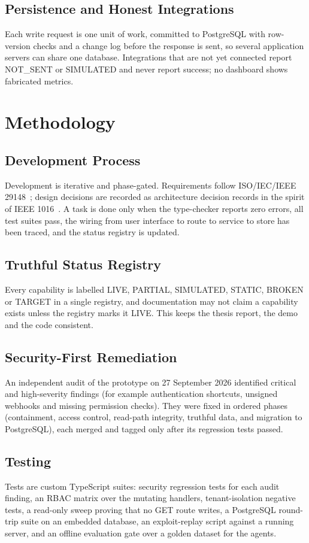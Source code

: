 \documentclass[conference,a4paper]{IEEEtran}
\begin{document}
\subsection{Persistence and Honest Integrations}
Each write request is one unit of work, committed to PostgreSQL with row-version checks and a change log before the response is sent, so several application servers can share one database. Integrations that are not yet connected report NOT\_SENT or SIMULATED and never report success; no dashboard shows fabricated metrics.


\section{Methodology}
\subsection{Development Process}
Development is iterative and phase-gated. Requirements follow ISO/IEC/IEEE 29148~\cite{iso29148}; design decisions are recorded as architecture decision records in the spirit of IEEE 1016~\cite{ieee1016}. A task is done only when the type-checker reports zero errors, all test suites pass, the wiring from user interface to route to service to store has been traced, and the status registry is updated.

\subsection{Truthful Status Registry}
Every capability is labelled LIVE, PARTIAL, SIMULATED, STATIC, BROKEN or TARGET in a single registry, and documentation may not claim a capability exists unless the registry marks it LIVE. This keeps the thesis report, the demo and the code consistent.

\subsection{Security-First Remediation}
An independent audit of the prototype on 27 September 2026 identified critical and high-severity findings (for example authentication shortcuts, unsigned webhooks and missing permission checks). They were fixed in ordered phases (containment, access control, read-path integrity, truthful data, and migration to PostgreSQL), each merged and tagged only after its regression tests passed.

\subsection{Testing}
Tests are custom TypeScript suites: security regression tests for each audit finding, an RBAC matrix over the mutating handlers, tenant-isolation negative tests, a read-only sweep proving that no GET route writes, a PostgreSQL round-trip suite on an embedded database, an exploit-replay script against a running server, and an offline evaluation gate over a golden dataset for the agents.
\end{document}
